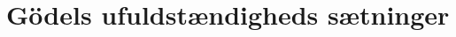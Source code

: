\ifx\preampleIncluded\undefined
\def\startGoedel{}


\fi

\section{Gödels ufuldstændigheds sætninger}

\ifdefined\startGoedel\fi
